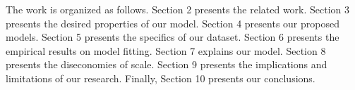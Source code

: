 The work is organized as follows. Section 2 presents the related work. Section 3 presents the desired properties of our model. Section 4 presents our proposed models. Section 5 presents the specifics of our dataset. Section 6 presents the empirical results on model fitting. Section 7 explains our model. Section 8 presents the diseconomies of scale. Section 9 presents the implications and limitations of our research. Finally, Section 10 presents our conclusions.

